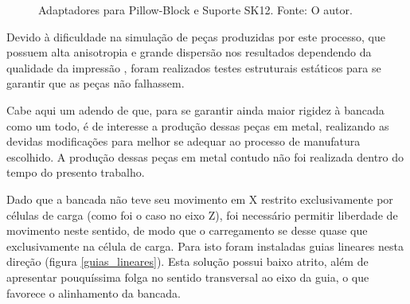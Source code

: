 \begin{figure}[!ht]
    \centering
    \caption{Adaptadores para Pillow-Block e Suporte SK12. Fonte: O autor.}
        \label{adaptador_pillow}
        \qquad
        \label{adaptador_sk12}
\end{figure}

Devido à dificuldade na simulação de peças produzidas por este processo, que possuem alta anisotropia e grande dispersão nos resultados dependendo da qualidade da impressão \citep{montero2001material}, foram realizados testes estruturais estáticos para se garantir que as peças não falhassem.

Cabe aqui um adendo de que, para se garantir ainda maior rigidez à bancada como um todo, é de interesse a produção dessas peças em metal, realizando as devidas modificações para melhor se adequar ao processo de manufatura escolhido. A produção dessas peças em metal contudo não foi realizada dentro do tempo do presento trabalho.

Dado que a bancada não teve seu movimento em X restrito exclusivamente por células de carga (como foi o caso no eixo Z), foi necessário permitir liberdade de movimento neste sentido, de modo que o carregamento se desse quase que exclusivamente na célula de carga. Para isto foram instaladas guias lineares nesta direção (figura \ref{guias_lineares}). Esta solução possui baixo atrito, além de apresentar pouquíssima folga no sentido transversal ao eixo da guia, o que favorece o alinhamento da bancada.


